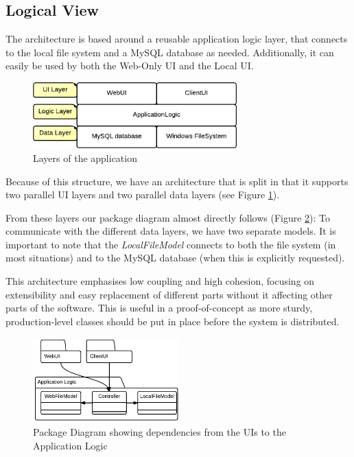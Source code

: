 \subsection{Logical View}

The architecture is based around a reusable application logic layer, that connects to the
local file system and a MySQL database as needed. Additionally, it can easily be used by
both the Web-Only UI and the Local UI.

\begin{figure}[htb]
	\centering
	\includegraphics[width=0.7\textwidth]{Software_architecture/graphics/application-layers.png}
	\caption{Layers of the application}
	\label{fig:application-layers}
\end{figure}

Because of this structure, we have an architecture that is split in that it supports two
parallel UI layers and two parallel data layers (see Figure \ref{fig:application-layers}).

From these layers our package diagram almost directly follows (Figure \ref{fig:package-diagram}):
To communicate with the different data layers, we have two separate models. It is important to
note that the \emph{LocalFileModel} connects to both the file system (in most situations) and
to the MySQL database (when this is explicitly requested).

This architecture emphasises low coupling and high cohesion, focusing on extensibility and
easy replacement of different parts without it affecting other parts of the software. This is
useful in a proof-of-concept as more sturdy, production-level classes should be put in place
before the system is distributed.

\begin{figure}[htb]
	\centering
	\includegraphics[width=0.5\textwidth]{Software_architecture/graphics/package-diagram.png}
	\caption{Package Diagram showing dependencies from the UIs to the Application Logic}
	\label{fig:package-diagram}
\end{figure}

